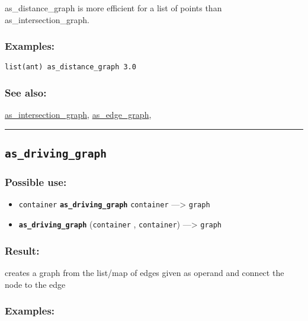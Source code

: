 \documentclass[]{book}
\providecommand{\tightlist}{%
  \setlength{\itemsep}{0pt}\setlength{\parskip}{0pt}}
\theoremstyle{definition}
\theoremstyle{definition}
\theoremstyle{definition}
\theoremstyle{remark}
\begin{document}
as\_distance\_graph is more efficient for a list of points than
as\_intersection\_graph.

\subsubsection{Examples:}\label{examples-37}

\begin{verbatim}
list(ant) as_distance_graph 3.0 
\end{verbatim}

\subsubsection{See also:}\label{see-also-30}

\href{OperatorsAA\#as_intersection_graph}{as\_intersection\_graph},
\href{OperatorsAA\#as_edge_graph}{as\_edge\_graph},

\begin{center}\rule{0.5\linewidth}{\linethickness}\end{center}

\subsection{\texorpdfstring{\texttt{as\_driving\_graph}}{as\_driving\_graph}}\label{as_driving_graph}

\subsubsection{Possible use:}\label{possible-use-46}

\begin{itemize}
\tightlist
\item
  \texttt{container} \textbf{\texttt{as\_driving\_graph}}
  \texttt{container} ---\textgreater{} \texttt{graph}
\item
  \textbf{\texttt{as\_driving\_graph}} (\texttt{container} ,
  \texttt{container}) ---\textgreater{} \texttt{graph}
\end{itemize}

\subsubsection{Result:}\label{result-45}

creates a graph from the list/map of edges given as operand and connect
the node to the edge

\subsubsection{Examples:}\label{examples-38}
\end{document}
